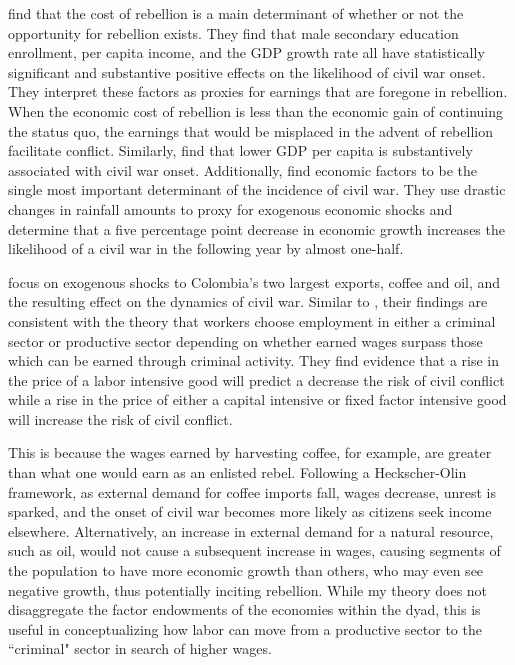 \documentclass[12pt,letterpaper]{article}
\begin{document}
\citet{CollierHoeffler2004} find that the cost of rebellion is a main determinant of whether or not the opportunity for rebellion exists. They find that male secondary education enrollment, per capita income, and the GDP growth rate all have statistically significant and substantive positive effects on the likelihood of civil war onset. They interpret these factors as proxies for earnings that are foregone in rebellion. When the economic cost of rebellion is less than the economic gain of continuing the status quo, the earnings that would be misplaced in the advent of rebellion facilitate conflict. Similarly, \citet{FearonLaitin2003} find that lower GDP per capita is substantively associated with civil war onset. Additionally, \citet{MiguelSatyanathSergenti2004} find economic factors to be the single most important determinant of the incidence of civil war. They use drastic changes in rainfall amounts to proxy for exogenous economic shocks and determine that a five percentage point decrease in economic growth increases the likelihood of a civil war in the following year by almost one-half. 

\citet{DubeVargas2013} focus on exogenous shocks to Colombia's two largest exports, coffee and oil, and the resulting effect on the dynamics of civil war. Similar to \citet{CollierHoeffler2004}, their findings are consistent with the theory that workers choose employment in either a criminal sector or productive sector depending on whether earned wages surpass those which can be earned through criminal activity. They find evidence that a rise in the price of a labor intensive good will predict a decrease the risk of civil conflict while a rise in the price of either a capital intensive or fixed factor intensive good will increase the risk of civil conflict. 

This is because the wages earned by harvesting coffee, for example, are greater than what one would earn as an enlisted rebel. Following a Heckscher-Olin framework, as external demand for coffee imports fall, wages decrease, unrest is sparked, and the onset of civil war becomes more likely as citizens seek income elsewhere. Alternatively, an increase in external demand for a natural resource, such as oil, would not cause a subsequent increase in wages, causing segments of the population to have more economic growth than others, who may even see negative growth, thus potentially inciting rebellion. While my theory does not disaggregate the factor endowments of the economies within the dyad, this is useful in conceptualizing how labor can move from a productive sector to the ``criminal" sector in search of higher wages. 
\end{document}
